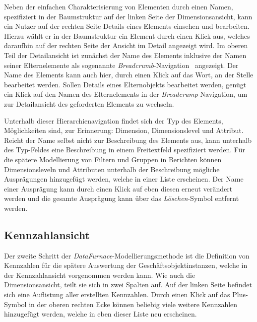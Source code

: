 \documentclass[
  language=german, %
  type=bachelor%
]{isthesis}
\begin{document}
\begin{content}

  Neben der einfachen Charakterisierung von Elementen durch einen Namen,
  spezifiziert in der Baumstruktur auf der linken Seite der Dimensionsansicht,
  kann ein Nutzer auf der rechten Seite Details eines Elements einsehen und
  bearbeiten.  Hierzu wählt er in der Baumstruktur ein Element durch einen
  Klick aus, welches daraufhin auf der rechten Seite der Ansicht im Detail
  angezeigt wird. Im oberen Teil der Detailansicht ist zunächst der Name des
  Elements inklusive der Namen seiner Elternelemente als sogenannte
  \textit{Breadcrumb}-Navigation~\cite[][S. 1316]{maldonado2002common}
  angezeigt.  Der Name des Elements kann auch hier, durch einen Klick auf das
  Wort, an der Stelle bearbeitet werden. Sollen Details eines Elternobjekts
  bearbeitet werden, genügt ein Klick auf den Namen des Elternelements in der
  \textit{Breadcrump}-Navigation, um zur Detailansicht des geforderten Elements
  zu wechseln. 

  Unterhalb dieser Hierarchienavigation findet sich der Typ des Elements,
  Möglichkeiten sind, zur Erinnerung: Dimension, Dimensionslevel und Attribut.
  Reicht der Name selbst nicht zur Beschreibung des Elements aus, kann
  unterhalb des Typ-Feldes eine Beschreibung in einem Freitextfeld spezifiziert
  werden. Für die spätere Modellierung von Filtern und Gruppen in Berichten
  können Dimensionsleveln und Attributen unterhalb der Beschreibung mögliche
  Ausprägungen hinzugefügt werden, welche in einer Liste erscheinen. Der Name
  einer Ausprägung kann durch einen Klick auf eben diesen erneut verändert
  werden und die gesamte Ausprägung kann über das
  \textit{Löschen}-Symbol entfernt werden.


  \subsection{Kennzahlansicht}

  Der zweite Schritt der \textit{DataFurnace}-Modellierungsmethode ist die
  Definition von Kennzahlen für die spätere Auswertung der
  Geschäftsobjektinstanzen, welche in der Kennzahlansicht vorgenommen werden
  kann. Wie auch die Dimensionsansicht, teilt sie sich in zwei Spalten auf. Auf
  der linken Seite befindet sich eine Auflistung aller erstellten Kennzahlen.
  Durch einen Klick auf das Plus-Symbol in der oberen rechten Ecke können
  beliebig viele weitere Kennzahlen hinzugefügt werden, welche in eben dieser
  Liste neu erscheinen.


\end{content}
\end{document}

